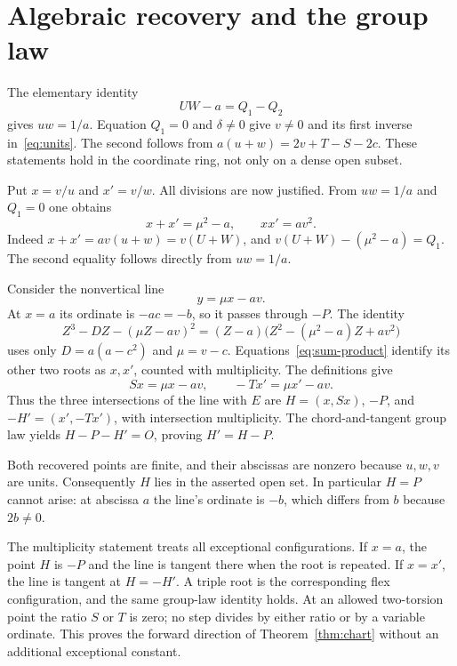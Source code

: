 \documentclass[11pt,a4paper]{article}
\begin{document}
\section{Algebraic recovery and the group law}
The elementary identity
\begin{equation}\label{eq:uw}
                            UW-a=Q_1-Q_2
\end{equation}
gives $uw=1/a$. Equation $Q_1=0$ and $\delta\ne0$ give $v\ne0$
and its first inverse in~\eqref{eq:units}. The second follows from
$a(u+w)=2v+T-S-2c$. These statements hold in the coordinate ring,
not only on a dense open subset.

Put $x=v/u$ and $x'=v/w$. All divisions are now justified. From
$uw=1/a$ and $Q_1=0$ one obtains
\begin{equation}\label{eq:sum-product}
 x+x'=\mu^2-a,\qquad xx'=av^2.
\end{equation}
Indeed $x+x'=av(u+w)=v(U+W)$, and
$v(U+W)-(\mu^2-a)=Q_1$. The second equality follows directly from
$uw=1/a$.

Consider the nonvertical line
\[
                             y=\mu x-av.
\]
At $x=a$ its ordinate is $-ac=-b$, so it passes through $-P$.
The identity
\begin{equation}\label{eq:cubic}
 Z^3-DZ-(\mu Z-av)^2
   =(Z-a)\bigl(Z^2-(\mu^2-a)Z+av^2\bigr)
\end{equation}
uses only $D=a(a-c^2)$ and $\mu=v-c$.
Equations~\eqref{eq:sum-product} identify its other two roots as
$x,x'$, counted with multiplicity. The definitions give
\[
 Sx=\mu x-av,\qquad -Tx'=\mu x'-av.
\]
Thus the three intersections of the line with $E$ are
$H=(x,Sx)$, $-P$, and $-H'= (x',-Tx')$, with intersection
multiplicity. The chord-and-tangent group law yields
$H-P-H'=O$, proving $H'=H-P$.

Both recovered points are finite, and their abscissas are nonzero
because $u,w,v$ are units. Consequently $H$ lies in the asserted open
set. In particular $H=P$ cannot arise: at abscissa $a$ the line's
ordinate is $-b$, which differs from $b$ because $2b\ne0$.

The multiplicity statement treats all exceptional configurations.
If $x=a$, the point $H$ is $-P$ and the line is tangent there when
the root is repeated. If $x=x'$, the line is tangent at $H=-H'$.
A triple root is the corresponding flex configuration, and the same
group-law identity holds. At an allowed two-torsion point the ratio
$S$ or $T$ is zero; no step divides by either ratio or by a variable
ordinate. This proves the forward direction of
Theorem~\ref{thm:chart} without an additional exceptional constant.
\end{document}
